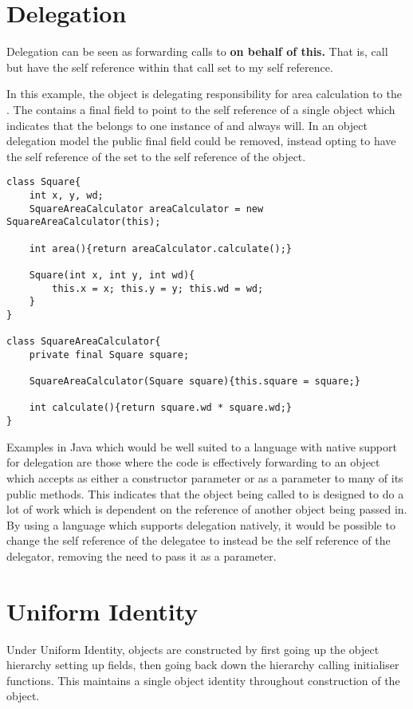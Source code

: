 \section{Delegation}
Delegation can be seen as forwarding  calls to  \textbf{on behalf of this.} That is, call  but have the self reference within that call set to my self reference.
\newline

In this example, the  object is delegating responsibility for area calculation to the . The  contains a final field to point to the self reference of a single  object which indicates that the  belongs to one instance of  and always will. In an object delegation model the public final field could be removed, instead opting to have the self reference of the  set to the self reference of the  object.
\begin{lstlisting}
class Square{
	int x, y, wd;
	SquareAreaCalculator areaCalculator = new SquareAreaCalculator(this);

	int area(){return areaCalculator.calculate();}

	Square(int x, int y, int wd){
		this.x = x; this.y = y; this.wd = wd;
	}
}

class SquareAreaCalculator{
	private final Square square;

	SquareAreaCalculator(Square square){this.square = square;}

	int calculate(){return square.wd * square.wd;}
}
\end{lstlisting}

Examples in Java which would be well suited to a language with native support for delegation are those where the code is effectively forwarding to an object which accepts  as either a constructor parameter or as a parameter to many of its public methods. This indicates that the object being called to is designed to do a lot of work which is dependent on the  reference of another object being passed in. By using a language which supports delegation natively, it would be possible to change the self reference of the delegatee to instead be the self reference of the delegator, removing the need to pass it as a parameter.

\section{Uniform Identity}
Under Uniform Identity, objects are constructed by first going up the object hierarchy setting up fields, then going back down the hierarchy calling initialiser functions. This maintains a single object identity throughout construction of the object.
\newline

